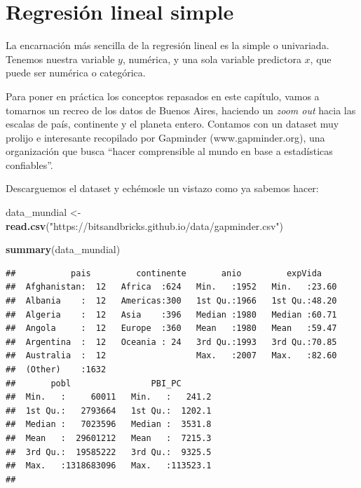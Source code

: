 \documentclass[spanish,]{book}
\newenvironment{Shaded}{\begin{snugshade}}{\end{snugshade}}
\newcommand{\KeywordTok}[1]{\textcolor[rgb]{0.13,0.29,0.53}{\textbf{#1}}}
\newcommand{\NormalTok}[1]{#1}
\newcommand{\StringTok}[1]{\textcolor[rgb]{0.31,0.60,0.02}{#1}}
\begin{document}
\hypertarget{regresiuxf3n-lineal-simple}{%
\section{Regresión lineal simple}\label{regresiuxf3n-lineal-simple}}

La encarnación más sencilla de la regresión lineal es la simple o univariada. Tenemos nuestra variable \(y\), numérica, y una sola variable predictora \(x\), que puede ser numérica o categórica.

Para poner en práctica los conceptos repasados en este capítulo, vamos a tomarnos un recreo de los datos de Buenos Aires, haciendo un \emph{zoom out} hacia las escalas de país, continente y el planeta entero. Contamos con un dataset muy prolijo e interesante recopilado por Gapminder (www.gapminder.org), una organización que busca ``hacer comprensible al mundo en base a estadísticas confiables''.

Descarguemos el dataset y echémosle un vistazo como ya sabemos hacer:

\begin{Shaded}
\begin{Highlighting}[]
\NormalTok{data_mundial <-}\StringTok{ }\KeywordTok{read.csv}\NormalTok{(}\StringTok{"https://bitsandbricks.github.io/data/gapminder.csv"}\NormalTok{)}

\KeywordTok{summary}\NormalTok{(data_mundial)}
\end{Highlighting}
\end{Shaded}

\begin{verbatim}
##           pais         continente       anio         expVida     
##  Afghanistan:  12   Africa  :624   Min.   :1952   Min.   :23.60  
##  Albania    :  12   Americas:300   1st Qu.:1966   1st Qu.:48.20  
##  Algeria    :  12   Asia    :396   Median :1980   Median :60.71  
##  Angola     :  12   Europe  :360   Mean   :1980   Mean   :59.47  
##  Argentina  :  12   Oceania : 24   3rd Qu.:1993   3rd Qu.:70.85  
##  Australia  :  12                  Max.   :2007   Max.   :82.60  
##  (Other)    :1632                                                
##       pobl                PBI_PC        
##  Min.   :     60011   Min.   :   241.2  
##  1st Qu.:   2793664   1st Qu.:  1202.1  
##  Median :   7023596   Median :  3531.8  
##  Mean   :  29601212   Mean   :  7215.3  
##  3rd Qu.:  19585222   3rd Qu.:  9325.5  
##  Max.   :1318683096   Max.   :113523.1  
## 
\end{verbatim}
\end{document}
